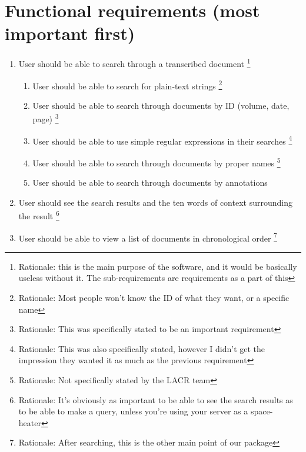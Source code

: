 \documentclass[10pt,a4paper]{report}
\begin{document}
    \section*{Functional requirements (most important first)}
        \begin{enumerate}
            \item User should be able to search through a transcribed document
            \footnote{Rationale: this is the main purpose of the software, and it would be basically useless without it. The sub-requirements are requirements as a part of this}
                \begin{enumerate}
                    \item User should be able to search for plain-text strings
                    \footnote{Rationale: Most people won't know the ID of what they want, or a specific name}
                    
                    \item User should be able to search through documents by ID (volume, date, page)
                    \footnote{Rationale: This was specifically stated to be an important requirement}
                    
                    \item User should be able to use simple regular expressions in their searches
                    \footnote{Rationale: This was also specifically stated, however I didn't get the impression they wanted it as much as the previous requirement}
                    
                    \item User should be able to search through documents by proper names
                    \footnote{Rationale: Not specifically stated by the LACR team}
                    
                    \item User should be able to search through documents by  annotations
                \end{enumerate}    
            \item User should see the search results and the ten words of context surrounding the result
            \footnote{Rationale: It's obviously as important to be able to see the search results as to be able to make a query, unless you're using your server as a space-heater}
            
            \item User should be able to view a list of documents in chronological order 
            \footnote{Rationale: After searching, this is the other main point of our package}
            

\end{enumerate}
\end{document}
